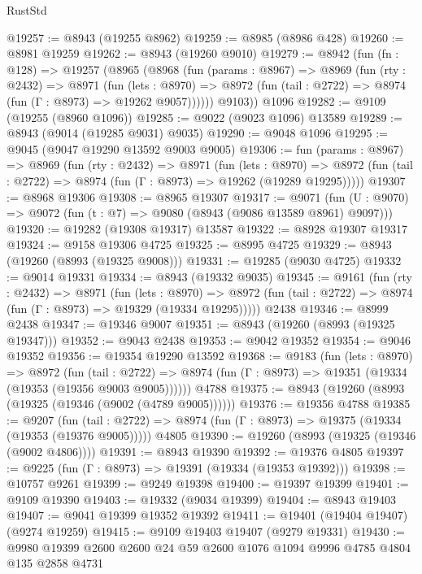 \begin{lexlean}{RustStd}
\begin{coremodule}
@19257 := @8943 (@19255 @8962)
@19259 := @8985 (@8986 @428)
@19260 := @8981 @19259
@19262 := @8943 (@19260 @9010)
@19279 := @8942
    (fun (fn : @128) =>
    @19257
      (@8965
        (@8968
          (fun (params : @8967) =>
          @8969
            (fun (rty : @2432) =>
            @8971
              (fun (lets : @8970) =>
              @8972 (fun (tail : @2722) => @8974 (fun (Γ : @8973) => @19262 @9057))))))
        @9103))
    @1096
@19282 := @9109 (@19255 (@8960 @1096))
@19285 := @9022 (@9023 @1096) @13589
@19289 := @8943 (@9014 (@19285 @9031) @9035)
@19290 := @9048 @1096
@19295 := @9045 (@9047 @19290 @13592 @9003 @9005)
@19306 := fun (params : @8967) =>
  @8969
    (fun (rty : @2432) =>
    @8971
      (fun (lets : @8970) =>
      @8972 (fun (tail : @2722) => @8974 (fun (Γ : @8973) => @19262 (@19289 @19295)))))
@19307 := @8968 @19306
@19308 := @8965 @19307
@19317 := @9071
    (fun (U : @9070) => @9072 (fun (t : @7) => @9080 (@8943 (@9086 @13589 @8961) @9097)))
@19320 := @19282 (@19308 @19317) @13587
@19322 := @8928 @19307 @19317
@19324 := @9158 @19306 @4725
@19325 := @8995 @4725
@19329 := @8943 (@19260 (@8993 (@19325 @9008)))
@19331 := @19285 (@9030 @4725)
@19332 := @9014 @19331
@19334 := @8943 (@19332 @9035)
@19345 := @9161
    (fun (rty : @2432) =>
    @8971
      (fun (lets : @8970) =>
      @8972 (fun (tail : @2722) => @8974 (fun (Γ : @8973) => @19329 (@19334 @19295)))))
    @2438
@19346 := @8999 @2438
@19347 := @19346 @9007
@19351 := @8943 (@19260 (@8993 (@19325 @19347)))
@19352 := @9043 @2438
@19353 := @9042 @19352
@19354 := @9046 @19352
@19356 := @19354 @19290 @13592
@19368 := @9183
    (fun (lets : @8970) =>
    @8972
      (fun (tail : @2722) =>
      @8974 (fun (Γ : @8973) => @19351 (@19334 (@19353 (@19356 @9003 @9005))))))
    @4788
@19375 := @8943 (@19260 (@8993 (@19325 (@19346 (@9002 (@4789 @9005))))))
@19376 := @19356 @4788
@19385 := @9207
    (fun (tail : @2722) => @8974 (fun (Γ : @8973) => @19375 (@19334 (@19353 (@19376 @9005)))))
    @4805
@19390 := @19260 (@8993 (@19325 (@19346 (@9002 @4806))))
@19391 := @8943 @19390
@19392 := @19376 @4805
@19397 := @9225 (fun (Γ : @8973) => @19391 (@19334 (@19353 @19392)))
@19398 := @10757 @9261
@19399 := @9249 @19398
@19400 := @19397 @19399
@19401 := @9109 @19390
@19403 := @19332 (@9034 @19399)
@19404 := @8943 @19403
@19407 := @9041 @19399 @19352 @19392
@19411 := @19401 (@19404 @19407) (@9274 @19259)
@19415 := @9109 @19403 @19407 (@9279 @19331)
@19430 := @9980
    @19399
    @2600
    @2600
    @24
    @59
    @2600
    @1076
    @1094
    @9996
    @4785
    @4804
    @135
    @2858
    @4731

\end{coremodule}
\end{lexlean}
